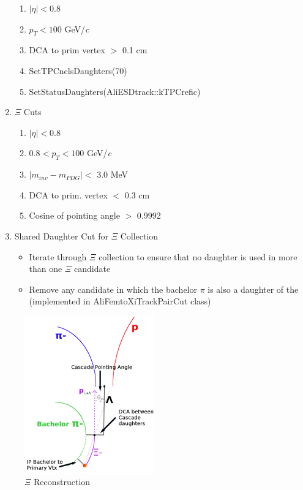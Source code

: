 \documentclass[../AnalysisNoteJBuxton.tex]{subfiles}
\begin{document}
\begin{enumerate}
 \begin{enumerate}
  \item $|\eta| < 0.8$
  \item $p_{T} < 100$ GeV/\textit{c}
  \item DCA to prim vertex $>$ 0.1 cm
  \item SetTPCnclsDaughters(70)
  \item SetStatusDaughters(AliESDtrack::kTPCrefic)
 \end{enumerate}
 \item $\Xi$ Cuts
 \begin{enumerate}
  \item $|\eta| < 0.8$
  \item $0.8 < p_{T} < 100$ GeV/\textit{c}
  \item $|m_{inv} - m_{PDG}| <$ 3.0 MeV
  \item DCA to prim. vertex $<$ 0.3 cm
  \item Cosine of pointing angle $>$ 0.9992
 \end{enumerate}
 
 
 \item Shared Daughter Cut for $\Xi$ Collection
 \begin{itemize}
  \item Iterate through $\Xi$ collection to ensure that no daughter is used in more than one $\Xi$ candidate
  \item Remove any candidate in which the bachelor $\pi$ is also a daughter of the \Lam (implemented in AliFemtoXiTrackPairCut class)
 \end{itemize} 
 
\end{enumerate}




\begin{figure}[h]
  \centering
  \includegraphics[width=0.5\textwidth]{3_DataSelection/Figures/XiCuts.pdf}
  \caption[$\Xi$ Reconstruction]{$\Xi$ Reconstruction}
  \label{fig:XiReconstruction}
\end{figure}
\end{document}
